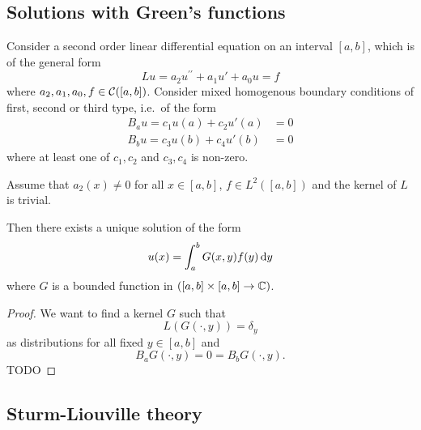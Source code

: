 \subsection{Solutions with Green's functions}
\begin{proposition}
Consider a second order linear differential equation on an interval $[a,b]$, which is of the general form
\[ Lu = a_2u^{\prime\prime} + a_1u' + a_0u = f \]
where $a_2,a_1, a_0, f\in \operatorname{\mathcal{C}}([a,b])$.
Consider mixed homogenous boundary conditions of first, second or third type, i.e.\ of the form
\begin{align*}
B_au = c_1 u(a) + c_2 u'(a) &= 0 \\
B_bu = c_3 u(b) + c_4 u'(b) &= 0
\end{align*}
where at least one of $c_1,c_2$ and $c_3,c_4$ is non-zero.

Assume that $a_2(x) \neq 0$ for all $x\in [a,b]$, $f\in L^2([a,b])$ and the kernel of $L$ is trivial.

Then there exists a unique solution of the form
\[ u(x) = \int_{a}^b G(x,y)f(y)\operatorname{d \!}{y} \]
where $G$ is a bounded function in $([a,b]\times [a,b] \to \mathbb{C})$.
\end{proposition}
\begin{proof}
We want to find a kernel $G$ such that
\[ L(G(\cdot, y)) = \delta_y \]
as distributions for all fixed $y\in [a,b]$ and
\[ B_aG(\cdot, y) = 0 = B_bG(\cdot, y). \]
TODO
\end{proof}

\subsection{Sturm-Liouville theory}
